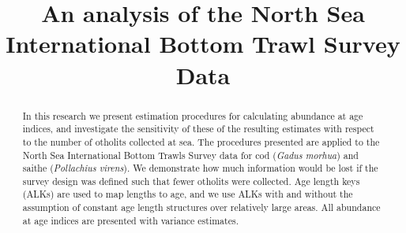 \documentclass[a4paper 12pt]{article}
\title{\bf 
}
\author{}
\date{}
\numberwithin{equation}{section}
\begin{document}


\title{An analysis of the North Sea International Bottom Trawl Survey Data}

\maketitle


\begin{abstract}

In this research we present estimation procedures for calculating abundance at age indices, and investigate the sensitivity of these of the resulting estimates with respect to the number of otholits collected at sea. The procedures presented are applied to the North Sea International Bottom Trawls Survey data for cod (\textit{Gadus morhua}) and saithe (\textit{Pollachius virens}). We demonstrate how much information would be lost if the survey design was defined such that fewer otholits were collected. Age length keys (ALKs) are used to map lengths to age, and we use ALKs with and without the assumption of constant age length structures over relatively large areas. All abundance at age indices are presented with variance estimates. \\

\end{abstract}
\end{document}
